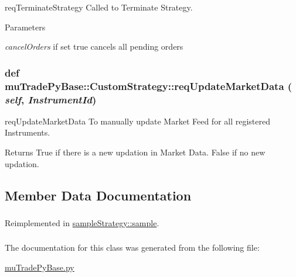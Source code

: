 reqTerminateStrategy Called to Terminate Strategy. 
\begin{DoxyParams}{Parameters}
\item[{\em cancelOrders}]if set true cancels all pending orders \end{DoxyParams}
\hypertarget{classmuTradePyBase_1_1CustomStrategy_a25d6d4941b75233ee3c126c8ff9def54}{
\subsubsection[{reqUpdateMarketData}]{\setlength{\rightskip}{0pt plus 5cm}def muTradePyBase::CustomStrategy::reqUpdateMarketData ( {\em self}, \/   {\em InstrumentId})}}
\label{classmuTradePyBase_1_1CustomStrategy_a25d6d4941b75233ee3c126c8ff9def54}


reqUpdateMarketData To manually update Market Feed for all registered Instruments. \begin{DoxyReturn}{Returns}
True if there is a new updation in Market Data. False if no new updation. 
\end{DoxyReturn}


\subsection{Member Data Documentation}
\hypertarget{classmuTradePyBase_1_1CustomStrategy_a6cd3aa3febbc8ad76120b43a7663301f}{
\subsubsection[{f}]{}}
\label{classmuTradePyBase_1_1CustomStrategy_a6cd3aa3febbc8ad76120b43a7663301f}


Reimplemented in \hyperlink{classsampleStrategy_1_1sample_af77b1aa404dd23099c1304660aba21c7}{sampleStrategy::sample}.\hypertarget{classmuTradePyBase_1_1CustomStrategy_aa800d9ce36ac2a140b0722db94ccdab9}{
\subsubsection[{tokenId}]{}}
\label{classmuTradePyBase_1_1CustomStrategy_aa800d9ce36ac2a140b0722db94ccdab9}


The documentation for this class was generated from the following file:\begin{DoxyCompactItemize}
\item 
\hyperlink{muTradePyBase_8py}{muTradePyBase.py}\end{DoxyCompactItemize}
